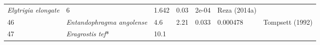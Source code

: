 \documentclass[]{article}
\begin{document}
\begin{longtable}[]{@{}lllllll@{}}
\begin{minipage}[t]{0.23\columnwidth}
\emph{Elytrigia elongate}\strut
\end{minipage} & \begin{minipage}[t]{0.05\columnwidth}\raggedright
6\strut
\end{minipage} & \begin{minipage}[t]{0.08\columnwidth}\raggedright
1.642\strut
\end{minipage} & \begin{minipage}[t]{0.08\columnwidth}\raggedright
0.03\strut
\end{minipage} & \begin{minipage}[t]{0.08\columnwidth}\raggedright
2e-04\strut
\end{minipage} & \begin{minipage}[t]{0.23\columnwidth}\raggedright
Reza (2014a)\strut
\end{minipage}\tabularnewline
\begin{minipage}[t]{0.05\columnwidth}\raggedright
46\strut
\end{minipage} & \begin{minipage}[t]{0.23\columnwidth}\raggedright
\emph{Entandophragma angolense}\strut
\end{minipage} & \begin{minipage}[t]{0.05\columnwidth}\raggedright
4.6\strut
\end{minipage} & \begin{minipage}[t]{0.08\columnwidth}\raggedright
2.21\strut
\end{minipage} & \begin{minipage}[t]{0.08\columnwidth}\raggedright
0.033\strut
\end{minipage} & \begin{minipage}[t]{0.08\columnwidth}\raggedright
0.000478\strut
\end{minipage} & \begin{minipage}[t]{0.23\columnwidth}\raggedright
Tompsett (1992)\strut
\end{minipage}\tabularnewline
\begin{minipage}[t]{0.05\columnwidth}\raggedright
47\strut
\end{minipage} & \begin{minipage}[t]{0.23\columnwidth}\raggedright
\emph{Eragrostis tef}*\strut
\end{minipage} & \begin{minipage}[t]{0.05\columnwidth}\raggedright
10.1\strut
\end{minipage} & \begin{minipage}[t]{0.08\columnwidth}\raggedright

\end{minipage}
\end{longtable}
\end{document}
